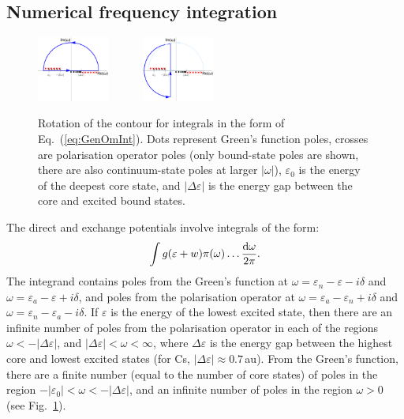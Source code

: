 \documentclass[10pt,twocolumn,a4paper]{article}%
\newcommand{\be}{\begin{equation}}
\newcommand{\ee}{\end{equation}}
\def\d{\ensuremath{{\rm d}}}
\def\en{\ensuremath{\varepsilon}}
\newcommand{\w}{\ensuremath{\omega}}
\begin{document}





\subsection{Numerical frequency integration}


\begin{figure}%
\centering%
\includegraphics[width=0.21\textwidth]{img/PreRotate}~~
\raisebox{14\height}{${\to}$}~~~
\includegraphics[width=0.21\textwidth]{img/RotatedOmega}%
\caption{\small Rotation of the contour for integrals in the form of Eq.~(\ref{eq:GenOmInt}).
Dots represent Green's function poles, crosses are polarisation operator poles (only bound-state poles are shown, there are also continuum-state poles at larger $|\w|$),
$\en_0$ is the energy of the deepest core state, and $|\Delta\en|$ is the energy gap between the core and excited bound states.
\label{fig:contourRotate}}
\end{figure}


The direct and exchange potentials involve integrals of the form:
\be\label{eq:GenOmInt}
\int g(\en+w)\pi(\w)\ldots \frac{\d\w}{2\pi}.
\ee
The integrand contains poles from the Green's function at
$\w=\en_n-\en-i\delta$ and $\w=\en_a-\en+i\delta$,
and poles from the polarisation operator at
$\w=\en_a-\en_n+i\delta$ and $\w=\en_n-\en_a-i\delta$.
If $\en$ is the energy of the lowest excited state, then
there are an infinite number of poles from the polarisation operator in each of the regions $\w<-|\Delta\en|$, and $|\Delta\en|<\w<\infty$,
where $\Delta\en$ is the energy gap between the highest core and lowest excited states (for Cs, $|\Delta\en|\approx0.7$\,au).
From the Green's function, there are a finite number (equal to the number of core states) of poles in the region
$-|\en_0|<\w<-|\Delta\en|$, and an infinite number of poles in the region $\w>0$ (see Fig.~\ref{fig:contourRotate}).
\end{document}
